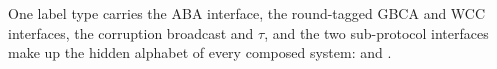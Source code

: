 \begin{definition}
  \label{def:aba-labels}
  \leanok
  One label type carries the ABA interface, the round-tagged GBCA and WCC interfaces, the corruption broadcast and $\tau$, and the two sub-protocol interfaces make up the hidden alphabet of every composed system:  and .
\end{definition}
